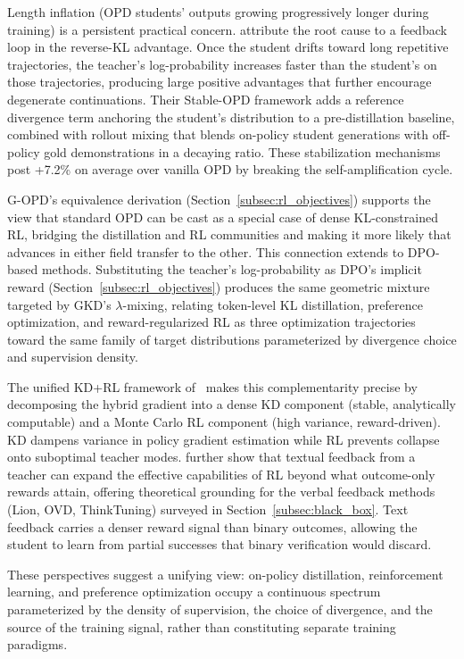 \documentclass{article} %
\begin{document}
Length inflation (OPD students' outputs growing progressively longer during training) is a persistent practical concern. \citet{2604.08527} attribute the root cause to a feedback loop in the reverse-KL advantage. Once the student drifts toward long repetitive trajectories, the teacher's log-probability increases faster than the student's on those trajectories, producing large positive advantages that further encourage degenerate continuations. Their Stable-OPD framework adds a reference divergence term anchoring the student's distribution to a pre-distillation baseline, combined with rollout mixing that blends on-policy student generations with off-policy gold demonstrations in a decaying ratio. These stabilization mechanisms post +7.2\% on average over vanilla OPD by breaking the self-amplification cycle.

G-OPD's equivalence derivation (Section~\ref{subsec:rl_objectives}) supports the view that standard OPD can be cast as a special case of dense KL-constrained RL, bridging the distillation and RL communities and making it more likely that advances in either field transfer to the other. This connection extends to DPO-based methods. Substituting the teacher's log-probability as DPO's implicit reward (Section~\ref{subsec:rl_objectives}) produces the same geometric mixture targeted by GKD's $\lambda$-mixing, relating token-level KL distillation, preference optimization, and reward-regularized RL as three optimization trajectories toward the same family of target distributions parameterized by divergence choice and supervision density.

The unified KD+RL framework of~\citet{2512.23097} makes this complementarity precise by decomposing the hybrid gradient into a dense KD component (stable, analytically computable) and a Monte Carlo RL component (high variance, reward-driven). KD dampens variance in policy gradient estimation while RL prevents collapse onto suboptimal teacher modes. \citet{2602.02482} further show that textual feedback from a teacher can expand the effective capabilities of RL beyond what outcome-only rewards attain, offering theoretical grounding for the verbal feedback methods (Lion, OVD, ThinkTuning) surveyed in Section~\ref{subsec:black_box}. Text feedback carries a denser reward signal than binary outcomes, allowing the student to learn from partial successes that binary verification would discard.

These perspectives suggest a unifying view: on-policy distillation, reinforcement learning, and preference optimization occupy a continuous spectrum parameterized by the density of supervision, the choice of divergence, and the source of the training signal, rather than constituting separate training paradigms.
\end{document}
